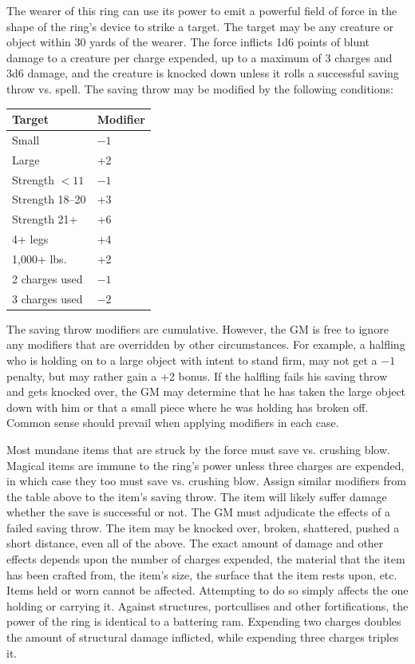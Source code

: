 \begin{multicols}{2}
The wearer of this ring can use its power to emit a powerful field of force in the shape of the ring's device to strike a target.  The target may be any creature or object within 30 yards of the wearer.  The force inflicts 1d6 points of blunt damage to a creature per charge expended, up to a maximum of 3 charges and 3d6 damage, and the creature is knocked down unless it rolls a successful saving throw vs. spell.  The saving throw may be modified by the following conditions:

\noindent
\begin{tabular}{|p{}|p{}|}
\hline
Target	& Modifier \\
\hline\hline
\rowcolor[gray]{.9}Small	& $-1$ \\
Large	& +2 \\
\rowcolor[gray]{.9}Strength $<11$	& $-1$ \\
Strength 18--20	& +3 \\
\rowcolor[gray]{.9}Strength 21+	& +6 \\
4+ legs	& +4 \\
\rowcolor[gray]{.9}1,000+ lbs.	& +2 \\
2 charges used	& $-1$ \\
\rowcolor[gray]{.9}3 charges used	& $-2$ \\
\hline
\end{tabular}

The saving throw modifiers are cumulative. However, the GM is free to ignore any modifiers that are overridden by other circumstances.  For example, a halfling who is holding on to a large object with intent to stand firm, may not get a $-1$ penalty, but may rather gain a +2 bonus.  If the halfling fails his saving throw and gets knocked over, the GM may determine that he has taken the large object down with him or that a small piece where he was holding has broken off.  Common sense should prevail when applying modifiers in each case. 

Most mundane items that are struck by the force must save vs. crushing blow.  Magical items are immune to the ring's power unless three charges are expended, in which case they too must save vs. crushing blow.  Assign similar modifiers from the table above to the item's saving throw.  The item will likely suffer damage whether the save is successful or not.  The GM must adjudicate the effects of a failed saving throw.  The item may be knocked over, broken, shattered, pushed a short distance, even all of the above.  The exact amount of damage and other effects depends upon the number of charges expended, the material that the item has been crafted from, the item's size, the surface that the item rests upon, etc.  Items held or worn cannot be affected.  Attempting to do so simply affects the one holding or carrying it.  Against structures, portcullises and other fortifications, the power of the ring is identical to a battering ram.  Expending two charges doubles the amount of structural damage inflicted, while expending three charges triples it.  


\end{multicols}
